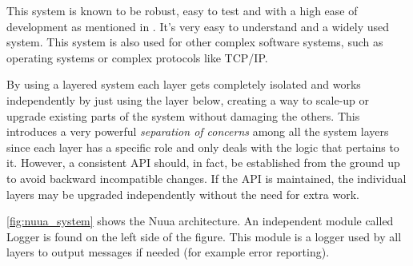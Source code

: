 This system is known to be robust, easy to test and with a high ease of development as mentioned in \autocite{software_architecture_patterns}.
It's very easy to understand and a widely used system. This system is also used for other complex software systems,
such as operating systems or complex protocols like TCP/IP.

By using a layered system each layer gets completely isolated and works independently by just using the layer below,
creating a way to scale-up or upgrade existing parts of the system without damaging the others. This introduces a
very powerful \emph{separation of concerns} among all the system layers since each layer has a specific role and only deals
with the logic that pertains to it.
However, a consistent API should, in fact, be established from the ground up to avoid backward incompatible changes.
If the API is maintained, the individual layers may be upgraded independently without the need for extra work.

\autoref{fig:nuua_system} shows the Nuua architecture. An independent module called Logger is found
on the left side of the figure. This module is a logger used by all layers to output messages if needed (for example error reporting).

